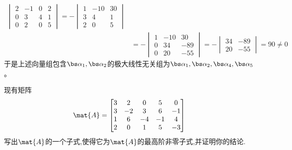 \documentclass{ctexart}
\begin{document}
\begin{solution}
\begin{enumerate}[label=\tbf{(\arabic*)},topsep=0pt,parsep=0pt,itemsep=0pt,partopsep=0pt]
\[\begin{aligned}
\begin{vmatrix}
        2&-1&0&2\\
        0&3&4&1\\
        0&2&0&5
    \end{vmatrix}=-\begin{vmatrix}
        1&-10&30\\
        3&4&1\\
        2&0&5
    \end{vmatrix}\\
    &=-\begin{vmatrix}
        1&-10&30\\
        0&34&-89\\
        0&20&-55
    \end{vmatrix}=-\begin{vmatrix}
        34&-89\\20&-55
    \end{vmatrix}=90\neq0
    \end{aligned}\]
    于是上述向量组包含$\bs\alpha_1,\bs\alpha_2$的极大线性无关组为$\bs\alpha_1,\bs\alpha_2,\bs\alpha_4,\bs\alpha_5$。
\end{enumerate}
\end{solution}
\begin{homework}[5]
    现有矩阵
    \[\mat{A}=\begin{bmatrix}
        3&2&0&5&0\\
        3&-2&3&6&-1\\
        1&6&-4&-1&4\\
        2&0&1&5&-3
    \end{bmatrix}\]
    写出$\mat{A}$的一个子式,使得它为$\mat{A}$的最高阶非零子式,并证明你的结论.
\end{homework}
\end{document}
